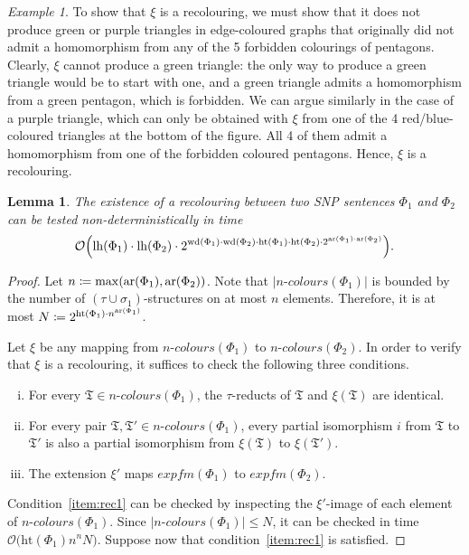 \documentclass[oneside,reqno,12pt]{amsart}
\theoremstyle{plain}
\newtheorem{lemma}[thm]{Lemma}
\theoremstyle{remark}
\newtheorem{example}[thm]{Example}
\renewcommand{\coloneqq}{\mathrel{\mathop:}\mathrel{\mkern-1.2mu}=}
\newcommand{\struct}[1]{\mathfrak{#1}}
\newcommand{\efm}{\ensuremath{\mathit{expfm}}\xspace}
\newcommand{\colours}{\ensuremath{n\text{-}\mathit{colours}}}
\newcommand{\hh}{\ensuremath{\mathrm{ht}}\xspace}
\newcommand{\lh}{\ensuremath{\mathrm{lh}}\xspace}
\newcommand{\wh}{\ensuremath{\mathrm{wd}}\xspace}
\newcommand{\ar}{\ensuremath{\mathrm{ar}}\xspace}
\begin{document}
{\begin{example}
To show that $\xi$ is a recolouring, we must show that it does not produce green or purple triangles in edge-coloured graphs that originally did not admit a homomorphism from any of the 5 forbidden colourings of pentagons.
Clearly, $\xi$ cannot produce a green triangle:  the only way to produce a green triangle would be  to start with one, and a green triangle admits a homomorphism from a green pentagon, which is forbidden.
We can argue similarly in the case of a purple triangle, which can only be obtained with $\xi$ from one of the 4 red/blue-coloured triangles at the bottom of the figure.
All 4 of them admit a homomorphism from one of the forbidden coloured pentagons. Hence, $\xi$ is a recolouring. 
\end{example}
\begin{lemma}\label{lemma:recolouring_nexptime} 
The existence of a recolouring between two SNP sentences $\Phi_1$ and $\Phi_2$ can be tested non-deterministically in time $$\mathcal{O}\Bigl(\lh(\Phi_1)\cdot \lh(\Phi_2) \cdot 2^{\wh(\Phi_1)\cdot \wh(\Phi_2)\cdot \hh(\Phi_1)\cdot\hh(\Phi_2) \cdot  2^{\ar(\Phi_1)\cdot \ar(\Phi_2)}}\Bigr).$$   
\end{lemma}

\begin{proof} Let $n\coloneqq \max(\ar(\Phi_1),\ar(\Phi_2))$.
Note that $|\colours(\Phi_1)|$ is bounded by the number of $(\tau\cup\sigma_1)$-structures on at most $n$ elements.
Therefore, it is at most $N\coloneqq2^{\hh(\Phi_1)\cdot n^{\ar(\Phi_1)}}$.

    Let $\xi$ be any mapping from $\colours(\Phi_1)$ to $\colours(\Phi_2)$.
In order to verify that $\xi$ is a recolouring, it suffices to check the following three conditions.
\begin{enumerate}[i.]
    \item \label{item:rec1} For every $\struct{T}\in\colours(\Phi_1)$, the $\tau$-reducts of $\struct{T}$ and $\xi(\struct{T})$ are identical.
    \item \label{item:rec2} For every pair $\struct{T},\struct{T}'\in\colours(\Phi_1)$, every partial isomorphism $i$ from $\struct{T}$ to $\struct{T}'$ is also a partial isomorphism from $\xi(\struct{T})$ to $\xi(\struct{T}')$.
    \item \label{item:rec3} The extension $\xi'$ maps $\efm(\Phi_1)$ to $\efm(\Phi_2)$.
\end{enumerate}

Condition~\eqref{item:rec1} can be checked by inspecting the $\xi'$-image of each element of $\colours(\Phi_1)$.
Since $|\colours(\Phi_1)|\leq N$, it can be checked in time $\mathcal{O}\bigl(\hh(\Phi_1)n^nN\bigr)$.
Suppose now  that condition~\eqref{item:rec1} is satisfied.


\end{proof}}
\end{document}
